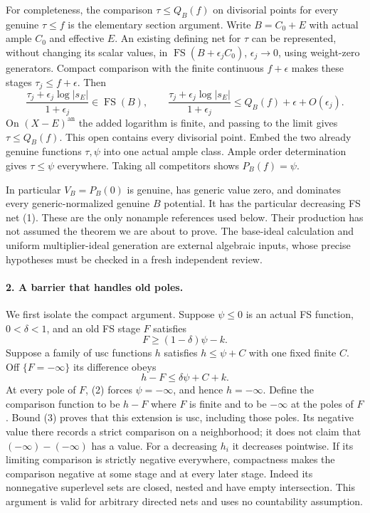 \documentclass[10pt]{article}
\newcommand{\FS}{\operatorname{FS}}
\newcommand{\an}{\mathrm{an}}
\begin{document}
For completeness, the comparison $\tau\le Q_B(f)$ on divisorial
points for every genuine $\tau\le f$ is the elementary section argument.
Write $B=C_0+E$ with actual ample $C_0$ and effective $E$.
An existing defining net for $\tau$ can be represented, without changing
its scalar values, in $\FS(B+\epsilon_j C_0)$, $\epsilon_j\to0$,
using weight-zero generators. Compact comparison with the finite
continuous $f+\epsilon$ makes these stages $\tau_j\le f+\epsilon$.
Then
\[
 \frac{\tau_j+\epsilon_j\log|s_E|}{1+\epsilon_j}
            \in\FS(B),
 \qquad
 \frac{\tau_j+\epsilon_j\log|s_E|}{1+\epsilon_j}
            \le Q_B(f)+\epsilon+O(\epsilon_j).
\]
On $(X-E)^\an$ the added logarithm is finite, and passing to the
limit gives $\tau\le Q_B(f)$. This open contains every divisorial
point. Embed the two already genuine functions $\tau,\psi$ into one
actual ample class. Ample order determination gives $\tau\le\psi$
everywhere. Taking all competitors shows $P_B(f)=\psi$.

In particular $V_B=P_B(0)$ is genuine, has generic value zero, and
dominates every generic-normalized genuine $B$ potential. It has the
particular decreasing FS net (1). These are the only nonample
references used below. Their production has not assumed the theorem
we are about to prove. The base-ideal calculation and uniform
multiplier-ideal generation are external algebraic inputs, whose
precise hypotheses must be checked in a fresh independent review.

\paragraph{2. A barrier that handles old poles.}
We first isolate the compact argument. Suppose $\psi\le0$ is an
actual FS function, $0<\delta<1$, and an old FS stage $F$ satisfies
\[
 F\ge(1-\delta)\psi-k.                                  \tag{2}
\]
Suppose a family of usc functions $h$ satisfies $h\le\psi+C$ with
one fixed finite $C$. Off $\{F=-\infty\}$ its difference obeys
\[
 h-F\le\delta\psi+C+k.                                  \tag{3}
\]
At every pole of $F$, (2) forces $\psi=-\infty$, and hence $h=-\infty$.
Define the comparison function to be $h-F$ where $F$ is finite and
to be $-\infty$ at the poles of $F$. Bound (3) proves that this
extension is usc, including those poles. Its negative value there
records a strict comparison on a neighborhood; it does not claim
that $(-\infty)-(-\infty)$ has a value.
For a decreasing $h_i$ it decreases pointwise. If its limiting
comparison is strictly negative everywhere, compactness makes
the comparison negative at some stage and at every later stage.
Indeed its nonnegative superlevel sets are closed, nested and have
empty intersection. This argument is valid for arbitrary directed
nets and uses no countability assumption.
\end{document}
